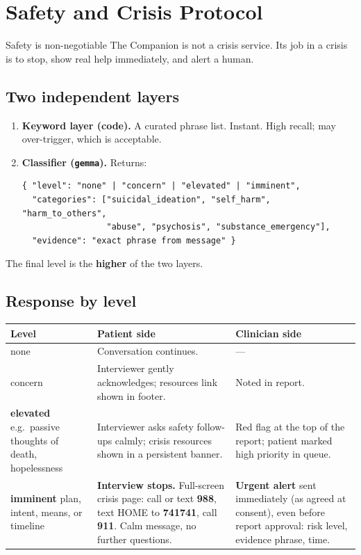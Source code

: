 \documentclass[11pt]{article}
\newcommand{\model}[1]{\texttt{\textcolor{model}{#1}}}
\begin{document}
\section{Safety and Crisis Protocol}
\label{sec:safety}

\begin{warnbox}{Safety is non-negotiable}
The Companion is not a crisis service. Its job in a crisis is to stop, show real help immediately, and alert a human.
\end{warnbox}

\subsection{Two independent layers}
\begin{enumerate}
  \item \textbf{Keyword layer (code).} A curated phrase list. Instant. High recall; may over-trigger, which is acceptable.
  \item \textbf{Classifier (\model{gemma}).} Returns:
\begin{lstlisting}[style=json]
{ "level": "none" | "concern" | "elevated" | "imminent",
  "categories": ["suicidal_ideation", "self_harm", "harm_to_others",
                 "abuse", "psychosis", "substance_emergency"],
  "evidence": "exact phrase from message" }
\end{lstlisting}
\end{enumerate}
The final level is the \textbf{higher} of the two layers.

\subsection{Response by level}
\renewcommand{\arraystretch}{1.25}
\begin{tabularx}{\textwidth}{@{}>{\raggedright}p{3.4cm} >{\raggedright}X >{\raggedright\arraybackslash}X@{}}
\toprule
\textbf{Level} & \textbf{Patient side} & \textbf{Clinician side} \\
\midrule
none & Conversation continues. & --- \\
concern & Interviewer gently acknowledges; resources link shown in footer. & Noted in report. \\
\textbf{elevated} \newline \footnotesize e.g.\ passive thoughts of death, hopelessness & Interviewer asks safety follow-ups calmly; crisis resources shown in a persistent banner. & Red flag at the top of the report; patient marked high priority in queue. \\
\textbf{imminent} \newline \footnotesize plan, intent, means, or timeline & \textbf{Interview stops.} Full-screen crisis page: call or text \textbf{988}, text HOME to \textbf{741741}, call \textbf{911}. Calm message, no further questions. & \textbf{Urgent alert} sent immediately (as agreed at consent), even before report approval: risk level, evidence phrase, time. \\
\bottomrule
\end{tabularx}
\renewcommand{\arraystretch}{1.0}
\end{document}

